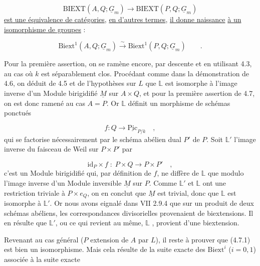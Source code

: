 \begin{equation*}
\mathrm{BIEXT}(A,Q;\underline{G}_m) \longrightarrow \mathrm{BIEXT}(P,Q;\underline{G}_m)
\end{equation*}
\underline{est une équivalence de catégories}, \underline{en d'autres termes}, \underline{il donne naissance} \underline{à un isomorphisme de groupes} :

\begin{equation}\tag{4.7.1}
\mathrm{Biext}^1(A,Q;\underline{G}_m) \stackrel{\sim}{\longrightarrow} \mathrm{Biext}^1(P,Q;\underline{G}_m) \qquad .
\end{equation}


Pour la première assertion, on se ramène encore, par descente et en utilisant 4.3, au cas où $k$ est séparablement clos. Procédant comme dans la démonstration de 4.6, on déduit de 4.5 et de l'hypothèses sur $L$ que $\mathbb{L}$ est isomorphe à l'image inverse d'un Module birigidifié $\underline{M}$ sur $A \times Q$, et pour la première assertion de 4.7, on est donc ramené au cas $A=P$. Or $\mathbb{L}$ définit un morphisme de schémas ponctués

\begin{equation*}
f:Q \longrightarrow \underline{\mathrm{Pic}}_{P/k} \quad ,
\end{equation*}
qui se factorise nécessairement par le schéma abélien dual $P'$ de $P$. Soit $\mathbb{L}'$ l'image inverse du faisceau de Weil sur $P \times P'$ par

\begin{equation*}
\mathrm{id}_P \times f \; : \; P \times Q \longrightarrow P \times P' \quad ,
\end{equation*}
c'est un Module birigidifié qui, par définition de $f$, ne diffère de $\mathbb{L}$ que modulo l'image inverse d'un Module inversible $\underline{M}$ sur $P$. Comme $\mathbb{L}'$ et $\mathbb{L}$ ont une restriction triviale à $P \times e_Q$, on en conclut que $\underline{M}$ est trivial, donc que $\mathbb{L}$ est isomorphe à $\mathbb{L}'$. Or nous avons eignalé dans VII 2.9.4 que sur un produit de deux schémas abéliens, les correspondances divisorielles provenaient de biextensions. Il en résulte que $\mathbb{L}'$, ou ce qui revient au même, $\mathbb{L}$ , provient d'une biextension.

Revenant au cas général ($P$ extension de $A$ par $L$), il reste à prouver que (4.7.1) est bien un isomorphisme. Mais cela résulte de la suite exacte des $\mathrm{Biext}^i$ ($i=0,1$) associée à la suite exacte

